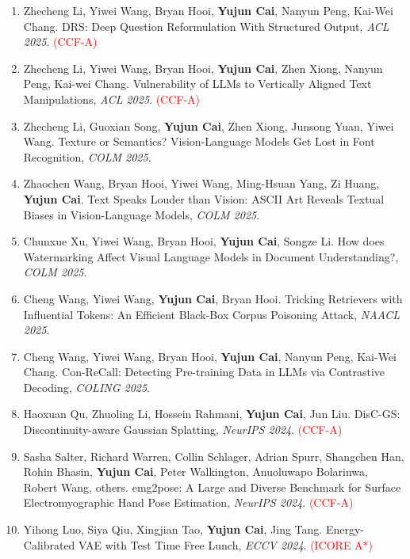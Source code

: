 \documentclass[11pt,letterpaper]{article}
\begin{document}
\begin{enumerate}
\item Zhecheng Li, Yiwei Wang, Bryan Hooi, \textbf{Yujun Cai}, Nanyun Peng, Kai-Wei Chang. DRS: Deep Question Reformulation With Structured Output, \textit{ACL 2025}. \textcolor{red}{(CCF-A)}

\item Zhecheng Li, Yiwei Wang, Bryan Hooi, \textbf{Yujun Cai}, Zhen Xiong, Nanyun Peng, Kai-wei Chang. Vulnerability of LLMs to Vertically Aligned Text Manipulations, \textit{ACL 2025}. \textcolor{red}{(CCF-A)}

\item Zhecheng Li, Guoxian Song, \textbf{Yujun Cai}, Zhen Xiong, Junsong Yuan, Yiwei Wang. Texture or Semantics? Vision-Language Models Get Lost in Font Recognition, \textit{COLM 2025}.

\item Zhaochen Wang, Bryan Hooi, Yiwei Wang, Ming-Hsuan Yang, Zi Huang, \textbf{Yujun Cai}. Text Speaks Louder than Vision: ASCII Art Reveals Textual Biases in Vision-Language Models, \textit{COLM 2025}.

\item Chunxue Xu, Yiwei Wang, Bryan Hooi, \textbf{Yujun Cai}, Songze Li. How does Watermarking Affect Visual Language Models in Document Understanding?, \textit{COLM 2025}.

\item Cheng Wang, Yiwei Wang, \textbf{Yujun Cai}, Bryan Hooi. Tricking Retrievers with Influential Tokens: An Efficient Black-Box Corpus Poisoning Attack, \textit{NAACL 2025}.

\item Cheng Wang, Yiwei Wang, Bryan Hooi, \textbf{Yujun Cai}, Nanyun Peng, Kai-Wei Chang. Con-ReCall: Detecting Pre-training Data in LLMs via Contrastive Decoding, \textit{COLING 2025}.

\item Haoxuan Qu, Zhuoling Li, Hossein Rahmani, \textbf{Yujun Cai}, Jun Liu. DisC-GS: Discontinuity-aware Gaussian Splatting, \textit{NeurIPS 2024}. \textcolor{red}{(CCF-A)}

\item Sasha Salter, Richard Warren, Collin Schlager, Adrian Spurr, Shangchen Han, Rohin Bhasin, \textbf{Yujun Cai}, Peter Walkington, Anuoluwapo Bolarinwa, Robert Wang, others. emg2pose: A Large and Diverse Benchmark for Surface Electromyographic Hand Pose Estimation, \textit{NeurIPS 2024}. \textcolor{red}{(CCF-A)}

\item Yihong Luo, Siya Qiu, Xingjian Tao, \textbf{Yujun Cai}, Jing Tang. Energy-Calibrated VAE with Test Time Free Lunch, \textit{ECCV 2024}. \textcolor{red}{(ICORE A*)}


\end{enumerate}
\end{document}
